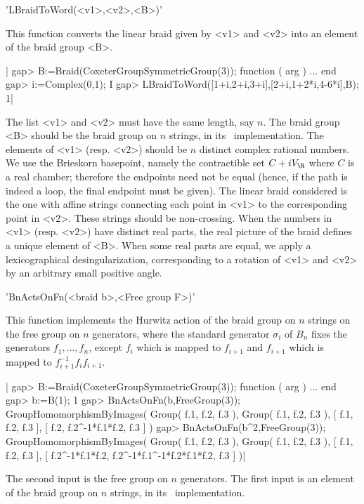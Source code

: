 'LBraidToWord(<v1>,<v2>,<B>)'

This function converts  the linear braid given by <v1>  and <v2> into an
element of the braid group <B>.

|    gap> B:=Braid(CoxeterGroupSymmetricGroup(3)); 
    function ( arg ) ... end
    gap> i:=Complex(0,1);
    I
    gap> LBraidToWord([1+i,2+i,3+i],[2+i,1+2*i,4-6*i],B);
    1|

The  list <v1> and <v2> must have the same length, say $n$. The braid group
<B>   should  be  the   braid  group  on   $n$  strings,  in  its  \CHEVIE\
implementation.  The elements of  <v1> (resp. <v2>)  should be $n$ distinct
complex  rational  numbers.  We  use  the  Brieskorn  basepoint, namely the
contractible  set  $C+iV_\R$  where  $C$  is  a real chamber; therefore the
endpoints need not be equal (hence, if the path is indeed a loop, the final
endpoint must be given). The linear braid considered is the one with affine
strings  connecting each point in <v1>  to the corresponding point in <v2>.
These strings should be non-crossing. When the numbers in <v1> (resp. <v2>)
have  distinct real parts, the  real picture of the  braid defines a unique
element  of <B>. When some real parts are equal, we apply a lexicographical
desingularization,  corresponding  to  a  rotation  of  <v1> and <v2> by an
arbitrary small positive angle.

\Section{BnActsOnFn}

'BnActsOnFn(<braid b>,<Free group F>)'

This function  implements the Hurwitz action  of the braid group  on $n$
strings  on  the  free  group  on $n$  generators,  where  the  standard
generator  $\sigma_i$ of  $B_n$  fixes  the generators  $f_1,\dots,f_n$,
except $f_i$ which is mapped to  $f_{i+1}$ and $f_{i+1}$ which is mapped
to $f_{i+1}^{-1}f_if_{i+1}$.

|    gap> B:=Braid(CoxeterGroupSymmetricGroup(3));
    function ( arg ) ... end
    gap> b:=B(1);
    1
    gap> BnActsOnFn(b,FreeGroup(3));
    GroupHomomorphismByImages( Group( f.1, f.2, f.3 ), Group( f.1, f.2, f.3 ), 
    [ f.1, f.2, f.3 ], [ f.2, f.2^-1*f.1*f.2, f.3 ] )
    gap> BnActsOnFn(b^2,FreeGroup(3));
    GroupHomomorphismByImages( Group( f.1, f.2, f.3 ), Group( f.1, f.2, f.3 ), 
    [ f.1, f.2, f.3 ], [ f.2^-1*f.1*f.2, f.2^-1*f.1^-1*f.2*f.1*f.2, f.3 ] )|

The second input is the free group on $n$ generators. The first input is
an  element  of  the  braid  group  on  $n$  strings,  in  its  \CHEVIE\
implementation.

